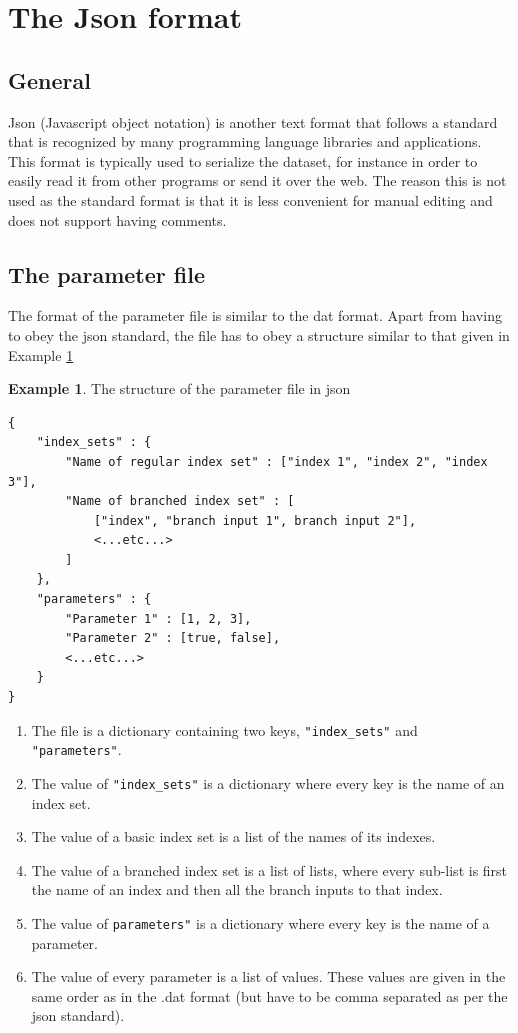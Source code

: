 \documentclass[11pt]{article}
\theoremstyle{definition}
\newtheorem{myexample}{Example}
\newenvironment{example}%
  {\begin{lrbox}{\examplebox}%
   \begin{minipage}{\dimexpr\linewidth-2\fboxsep}
   \begin{myexample}}%
  {\end{myexample}%
   \end{minipage}%
   \end{lrbox}%
   \begin{trivlist}
     \item[]\colorbox{silver}{\usebox\examplebox}
   \end{trivlist}}
\begin{document}
\section{The Json format}

\subsection{General}

Json (Javascript object notation)  is another text format that follows a standard that is recognized by many programming language libraries and applications. This format is typically used to serialize the dataset, for instance in order to easily read it from other programs or send it over the web. The reason this is not used as the standard format is that it is less convenient for manual editing and does not support having comments.

\subsection{The parameter file}
The format of the parameter file is similar to the dat format. Apart from having to obey the json standard, the file has to obey a structure similar to that given in Example \ref{ex:jsonpar}

\begin{example}\label{ex:jsonpar}
The structure of the parameter file in json
\begin{lstlisting}
{
	"index_sets" : {
		"Name of regular index set" : ["index 1", "index 2", "index 3"],
		"Name of branched index set" : [
			["index", "branch input 1", branch input 2"],
			<...etc...>
		]
	},
	"parameters" : {
		"Parameter 1" : [1, 2, 3],
		"Parameter 2" : [true, false],
		<...etc...>
	}
}
\end{lstlisting}
\end{example}

\begin{enumerate}[i]
\item The file is a dictionary containing two keys, {\tt "index\_sets"} and {\tt "parameters"}.
\item The value of {\tt "index\_sets"} is a dictionary where every key is the name of an index set.
\item The value of a basic index set is a list of the names of its indexes.
\item The value of a branched index set is a list of lists, where every sub-list is first the name of an index and then all the branch inputs to that index.
\item The value of {\tt parameters"} is a dictionary where every key is the name of a parameter.
\item The value of every parameter is a list of values. These values are given in the same order as in the .dat format (but have to be comma separated as per the json standard).
\end{enumerate}
\end{document}
